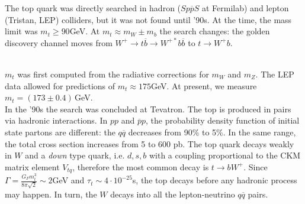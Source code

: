 \documentclass[10.75pt,a4paper,openright,bottom=2cm]{article}
\begin{document}
The top quark was directly searched in hadron ($Sp\overline{p}S$ at Fermilab) and lepton (Tristan, LEP) colliders, but it was not found until '90s. At the time, the mass limit was $m_t\ge90$\;GeV. At $m_t\approx m_W\pm m_b$ the search changes: the golden discovery channel moves from $W^+\to t\overline{b}\to W^{+*}b\overline{b}$ to $t\to W^+b$.\\
\begin{minipage}{0.5\textwidth}
\begin{center}
\end{center}
\end{minipage}\hfill
\begin{minipage}{0.5\textwidth}
\begin{center}
\end{center}
\end{minipage}\\
$m_t$ was first computed from the radiative corrections for $m_W$ and $m_Z$. The LEP data allowed for predictions of $m_t\approx175$\;GeV. At present, we measure $m_t=(173\pm0.4)$\,GeV.\\
In the '90s the search was concluded at Tevatron. The top is produced in pairs via hadronic interactions. In $pp$ and $\overline{p}p$, the probability density function of initial state partons are different: the $q\overline{q}$ decreases from 90\% to 5\%. In the same range, the total cross section increases from 5 to 600 pb. The top quark decays weakly in $W$ and a \textit{down} type quark, i.e. $d,s,b$ with a coupling proportional to the CKM matrix element $V_{tq}$, therefore the most common decay is $t\to bW^+$. Since $\Gamma=\frac{G_F m_t^3}{8\pi\sqrt{2}}\sim2$\;GeV and $\tau_t\sim4\cdot10^{-25}$\;s, the top decays before any hadronic process may happen. In turn, the $W$ decays into all the lepton-neutrino $q\overline{q}$ pairs.\\
\end{document}
